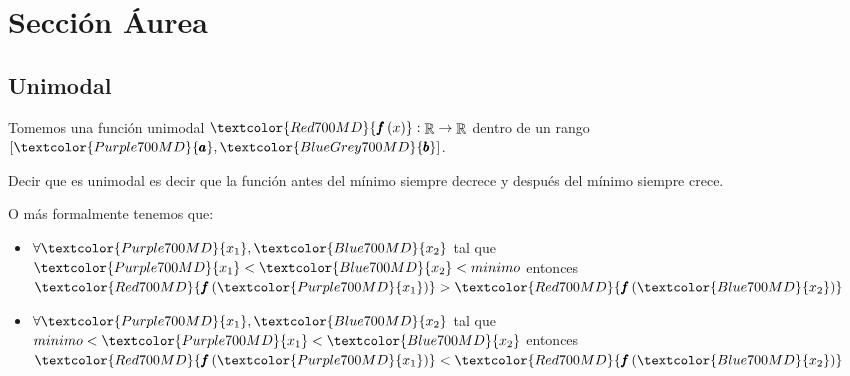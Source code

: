 \documentclass[12pt, fleqn]{article}                            %
\theoremstyle{break}                                            %
\DeclareMathOperator \Reals        {\mathbb{R}}                 %
\newcommand{\Wrap}[1]           {\left( #1 \right)}             %
\newcommand{\Color}[2]{\textcolor{#1}{#2}}                      %
\newcommand \ColorFun          {Red700MD}                       %
\newcommand \ColorVarA         {Purple700MD}                    %
\newcommand \ColorVarB         {BlueGrey700MD}                  %
\newcommand \ColorVarXOne      {Purple700MD}                    %
\newcommand \ColorVarXTwo      {Blue700MD}                      %
\newcommand \Fun[1]      {\Color{\ColorFun}{\pmb{f}\Wrap{#1}}}          %
\newcommand \VarA        {\Color{\ColorVarA}{\pmb{a} }}                 %
\newcommand \VarB        {\Color{\ColorVarB}{\pmb{b} }}                 %
\newcommand \VarXOne     {\Color{\ColorVarXOne}{x_{1}  }}               %
\newcommand \VarXTwo     {\Color{\ColorVarXTwo}{x_{2}  }}               %
\begin{document}
\restoregeometry                                                    %
\nopagecolor                                                        %




\tableofcontents{}
\label{sec:Index}

\clearpage


    \clearpage
    \section{Sección Áurea}
            
        \subsection{Unimodal}

            Tomemos una función unimodal $\Fun{x} : \Reals \to \Reals$ dentro de un rango
            $[\VarA, \VarB]$.

            Decir que es unimodal es decir que la función antes del mínimo siempre 
            decrece y después del mínimo siempre crece.

            O más formalmente tenemos que:
            \begin{itemize}
                \item $\forall \VarXOne, \VarXTwo$ tal que 
                    $\VarXOne < \VarXTwo < minimo$ entonces $\Fun{\VarXOne} > \Fun{\VarXTwo}$ 
                \item $\forall \VarXOne, \VarXTwo$ tal que 
                    $minimo < \VarXOne < \VarXTwo$ entonces $\Fun{\VarXOne} < \Fun{\VarXTwo}$ 
            \end{itemize}

            
\end{document}
